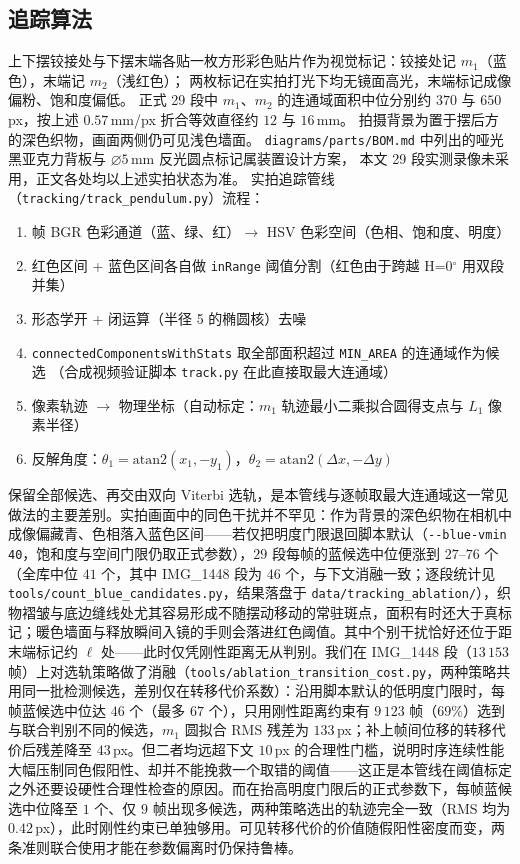 \documentclass[a4paper,12pt]{ctexart}   %
\newcommand{\thetaone}{\theta_1}
\newcommand{\thetatwo}{\theta_2}
\begin{document}
\subsection{追踪算法}
上下摆铰接处与下摆末端各贴一枚方形彩色贴片作为视觉标记：铰接处记 $m_1$（蓝色），末端记 $m_2$（浅红色）；
两枚标记在实拍打光下均无镜面高光，末端标记成像偏粉、饱和度偏低。
正式 29 段中 $m_1$、$m_2$ 的连通域面积中位分别约 $370$ 与 $650$\,px，按上述 $0.57$\,mm/px 折合等效直径约 $12$ 与 $16$\,mm。
拍摄背景为置于摆后方的深色织物，画面两侧仍可见浅色墙面。
\texttt{diagrams/parts/BOM.md} 中列出的哑光黑亚克力背板与 $\varnothing 5$\,mm 反光圆点标记属装置设计方案，
本文 29 段实测录像未采用，正文各处均以上述实拍状态为准。
实拍追踪管线（\texttt{tracking/track\_pendulum.py}）流程：
\begin{enumerate}[leftmargin=2em]
  \item 帧 BGR 色彩通道（蓝、绿、红）$\to$ HSV 色彩空间（色相、饱和度、明度）
  \item 红色区间 + 蓝色区间各自做 \texttt{inRange} 阈值分割（红色由于跨越 H=0$^\circ$ 用双段并集）
  \item 形态学开 + 闭运算（半径 5 的椭圆核）去噪
  \item \texttt{connectedComponentsWithStats} 取全部面积超过 \texttt{MIN\_AREA} 的连通域作为候选
        （合成视频验证脚本 \texttt{track.py} 在此直接取最大连通域）
  \item 像素轨迹 $\to$ 物理坐标（自动标定：$m_1$ 轨迹最小二乘拟合圆得支点与 $L_1$ 像素半径）
  \item 反解角度：$\thetaone = \mathrm{atan2}(x_1, -y_1)$，$\thetatwo = \mathrm{atan2}(\Delta x, -\Delta y)$
\end{enumerate}
保留全部候选、再交由双向 Viterbi 选轨，是本管线与逐帧取最大连通域这一常见做法的主要差别。实拍画面中的同色干扰并不罕见：作为背景的深色织物在相机中成像偏藏青、色相落入蓝色区间——若仅把明度门限退回脚本默认（\texttt{-{}-blue-vmin 40}，饱和度与空间门限仍取正式参数），$29$ 段每帧的蓝候选中位便涨到 $27\text{--}76$ 个（全库中位 $41$ 个，其中 IMG\_1448 段为 $46$ 个，与下文消融一致；逐段统计见 \texttt{tools/count\_blue\_candidates.py}，结果落盘于 \texttt{data/tracking\_ablation/}），织物褶皱与底边缝线处尤其容易形成不随摆动移动的常驻斑点，面积有时还大于真标记；暖色墙面与释放瞬间入镜的手则会落进红色阈值。其中个别干扰恰好还位于距末端标记约 $\ell$ 处——此时仅凭刚性距离无从判别。我们在 IMG\_1448 段（$13\,153$ 帧）上对选轨策略做了消融（\texttt{tools/ablation\_transition\_cost.py}，两种策略共用同一批检测候选，差别仅在转移代价系数）：沿用脚本默认的低明度门限时，每帧蓝候选中位达 $46$ 个（最多 $67$ 个），只用刚性距离约束有 $9\,123$ 帧（$69\%$）选到与联合判别不同的候选，$m_1$ 圆拟合 RMS 残差为 $133$\,px；补上帧间位移的转移代价后残差降至 $43$\,px。但二者均远超下文 $10$\,px 的合理性门槛，说明时序连续性能大幅压制同色假阳性、却并不能挽救一个取错的阈值——这正是本管线在阈值标定之外还要设硬性合理性检查的原因。而在抬高明度门限后的正式参数下，每帧蓝候选中位降至 $1$ 个、仅 $9$ 帧出现多候选，两种策略选出的轨迹完全一致（RMS 均为 $0.42$\,px），此时刚性约束已单独够用。可见转移代价的价值随假阳性密度而变，两条准则联合使用才能在参数偏离时仍保持鲁棒。
\end{document}
